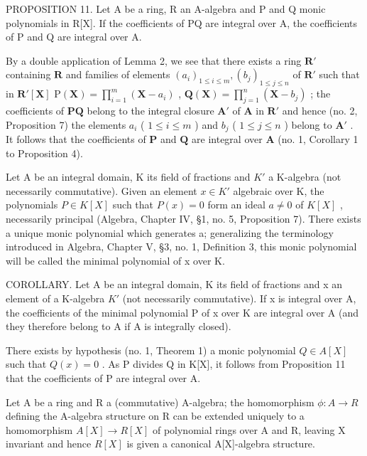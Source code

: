 PROPOSITION 11. Let A be a ring, R an A-algebra and P and Q monic polynomials in R{[}X{]}. If the coefficients of PQ are integral over A, the coefficients of P and Q are integral over A.

By a double application of Lemma 2, we see that there exists a ring \(\mathbf{R}'\) containing \(\mathbf{R}\) and families of elements \((a_i)_{1 \leqslant i \leqslant m}, (b_j)_{1 \leqslant j \leqslant n}\) of \(\mathbf{R}'\) such that in \(\mathbf{R}'[\mathbf{X}]\) \(\mathrm{P}(\mathbf{X}) = \prod_{i=1}^{m} (\mathbf{X} - a_i)\) , \(\mathbf{Q}(\mathbf{X}) = \prod_{j=1}^{n} (\mathbf{X} - b_j)\) ; the coefficients of \(\mathbf{PQ}\) belong to the integral closure \(\mathbf{A}'\) of \(\mathbf{A}\) in \(\mathbf{R}'\) and hence (no. 2, Proposition 7) the elements \(a_i\) ( \(1 \leqslant i \leqslant m\) ) and \(b_j\) ( \(1 \leqslant j \leqslant n\) ) belong to \(\mathbf{A}'\) . It follows that the coefficients of \(\mathbf{P}\) and \(\mathbf{Q}\) are integral over \(\mathbf{A}\) (no. 1, Corollary 1 to Proposition 4).

Let A be an integral domain, K its field of fractions and \(K'\) a K-algebra (not necessarily commutative). Given an element \(x \in K'\) algebraic over K, the polynomials \(P \in K[X]\) such that \(P(x) = 0\) form an ideal \(a \neq 0\) of \(K[X]\) , necessarily principal (Algebra, Chapter IV, §1, no. 5, Proposition 7). There exists a unique monic polynomial which generates a; generalizing the terminology introduced in Algebra, Chapter V, §3, no. 1, Definition 3, this monic polynomial will be called the minimal polynomial of x over K.

COROLLARY. Let A be an integral domain, K its field of fractions and x an element of a K-algebra \(K'\) (not necessarily commutative). If x is integral over A, the coefficients of the minimal polynomial P of x over K are integral over A (and they therefore belong to A if A is integrally closed).

There exists by hypothesis (no. 1, Theorem 1) a monic polynomial \(Q \in A[X]\) such that \(Q(x) = 0\) . As P divides Q in K{[}X{]}, it follows from Proposition 11 that the coefficients of P are integral over A.

Let A be a ring and R a (commutative) A-algebra; the homomorphism \(\phi: A \rightarrow R\) defining the A-algebra structure on R can be extended uniquely to a homomorphism \(A[X] \rightarrow R[X]\) of polynomial rings over A and R, leaving X invariant and hence \(R[X]\) is given a canonical A{[}X{]}-algebra structure.

